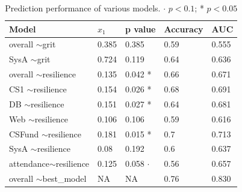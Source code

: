 \documentclass[sigconf]{acmart}
\begin{document}
\begin{table}[]
\caption{Prediction performance of various models. $\cdot$ $p < 0.1$; * $p < 0.05$}
\begin{tabular}{lllll}
\hline
\multicolumn{1}{|l|}{\textbf{Model}} & \multicolumn{1}{l|}{\textbf{$x_1$}} & \multicolumn{1}{l|}{\textbf{p value}} & \multicolumn{1}{l|}{\textbf{Accuracy}} & \multicolumn{1}{l|}{\textbf{AUC}} \\ \hline
overall $\sim$grit                   & 0.385                              & 0.385                                 & 0.59                                   & 0.555                             \\
SysA $\sim$grit                      & 0.724                              & 0.119                                 & 0.64                                   & 0.636  \\ \hline
overall $\sim$resilience             & 0.135                              & 0.042 *                               & 0.66                                   & 0.671                             \\
CS1 $\sim$resilience                 & 0.154                              & 0.026 *                               & 0.68                                   & 0.691                             \\
DB $\sim$resilience                  & 0.151                              & 0.027 *                               & 0.64                                   & 0.681                             \\
Web $\sim$resilience                 & 0.106                              & 0.106                                 & 0.59                                   & 0.616                             \\
CSFund $\sim$resilience              & 0.181                              & 0.015 *                               & 0.7                                    & 0.713                             \\
SysA $\sim$resilience                & 0.08                               & 0.192                                 & 0.6                                    & 0.637                             \\
attendance$\sim$resilience           & 0.125                              & 0.058 $\cdot$                               & 0.56                                   & 0.657                             \\ \hline
overall $\sim$best\_model            & NA                                 & NA                                    & 0.76                                   & 0.830                            
\end{tabular}
\label{tab:model_performance}
\end{table}
\end{document}
